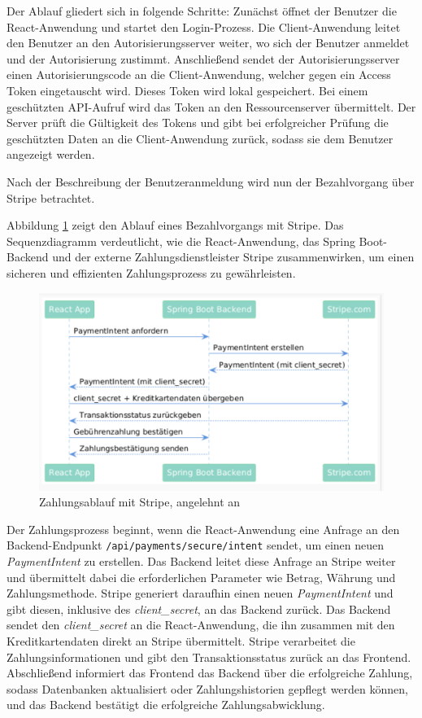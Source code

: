 \noindent Der Ablauf gliedert sich in folgende Schritte: Zunächst öffnet der Benutzer die React-Anwendung und startet den Login-Prozess. Die Client-Anwendung leitet den Benutzer an den Autorisierungsserver weiter, wo sich der Benutzer anmeldet und der Autorisierung zustimmt. Anschließend sendet der Autorisierungsserver einen Autorisierungscode an die Client-Anwendung, welcher gegen ein Access Token eingetauscht wird. Dieses Token wird lokal gespeichert. Bei einem geschützten API-Aufruf wird das Token an den Ressourcenserver übermittelt. Der Server prüft die Gültigkeit des Tokens und gibt bei erfolgreicher Prüfung die geschützten Daten an die Client-Anwendung zurück, sodass sie dem Benutzer angezeigt werden.

\noindent Nach der Beschreibung der Benutzeranmeldung wird nun der Bezahlvorgang über Stripe betrachtet.

\noindent Abbildung \ref{fig:Stripe-Zahlungsablauf} zeigt den Ablauf eines Bezahlvorgangs mit Stripe. Das Sequenzdiagramm verdeutlicht, wie die React-Anwendung, das Spring Boot-Backend und der externe Zahlungsdienstleister Stripe zusammenwirken, um einen sicheren und effizienten Zahlungsprozess zu gewährleisten.

\begin{figure}[H]
	\centering
	\includegraphics[width=\textwidth]{images/SequenceDiagram-Stripe.png}
	\caption{Zahlungsablauf mit Stripe, angelehnt an \cite{STRIPEAPIFLOW2025}}
	\label{fig:Stripe-Zahlungsablauf} 
\end{figure} 

\noindent Der Zahlungsprozess beginnt, wenn die React-Anwendung eine Anfrage an den Backend-Endpunkt \texttt{/api/payments/secure/intent} sendet, um einen neuen \textit{PaymentIntent} zu erstellen. Das Backend leitet diese Anfrage an Stripe weiter und übermittelt dabei die erforderlichen Parameter wie Betrag, Währung und Zahlungsmethode. Stripe generiert daraufhin einen neuen \textit{PaymentIntent} und gibt diesen, inklusive des \textit{client\_secret}, an das Backend zurück. Das Backend sendet den \textit{client\_secret} an die React-Anwendung, die ihn zusammen mit den Kreditkartendaten direkt an Stripe übermittelt. Stripe verarbeitet die Zahlungsinformationen und gibt den Transaktionsstatus zurück an das Frontend. Abschließend informiert das Frontend das Backend über die erfolgreiche Zahlung, sodass Datenbanken aktualisiert oder Zahlungshistorien gepflegt werden können, und das Backend bestätigt die erfolgreiche Zahlungsabwicklung.

